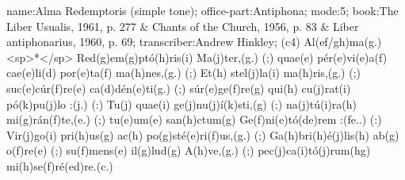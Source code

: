name:Alma Redemptoris (simple tone);
office-part:Antiphona;
mode:5;
book:The Liber Usualis, 1961, p. 277 & Chants of the Church, 1956, p. 83 & Liber antiphonarius, 1960, p. 69;
transcriber:Andrew Hinkley;
(c4) Al(ef/gh)ma(g.) <sp>*</sp> Red(g)em(g)ptó(h)ris(i) Ma(j)ter,(g.) (;) quae(e) pér(e)vi(e)a(f) cae(e)li(d) por(e)ta(f) ma(h)nes,(g.) (;) Et(h) stel(j)la(i) ma(h)ris,(g.) (;) suc(e)cúr(f)re(e) ca(d)dén(e)ti(g.) (;) súr(e)ge(f)re(g) qui(h) cu(j)rat(i) pó(k)pu(j)lo :(j.) (:) Tu(j) quae(i) ge(j)nu(j)í(k)sti,(g) (;) na(j)tú(i)ra(h) mi(g)rán(f)te,(e.) (;) tu(e)um(e) san(h)ctum(g) Ge(f)ni(e)tó(de)rem :(fe..) (:) Vir(j)go(i) pri(h)us(g) ac(h) po(g)sté(e)ri(f)us,(g.) (;) Ga(h)bri(h)é(j)lis(h) ab(g) o(f)re(e) (;) su(f)mens(e) il(g)lud(g) A(h)ve,(g.) (;) pec(j)ca(i)tó(j)rum(hg) mi(h)se(f)ré(ed)re.(c.)
